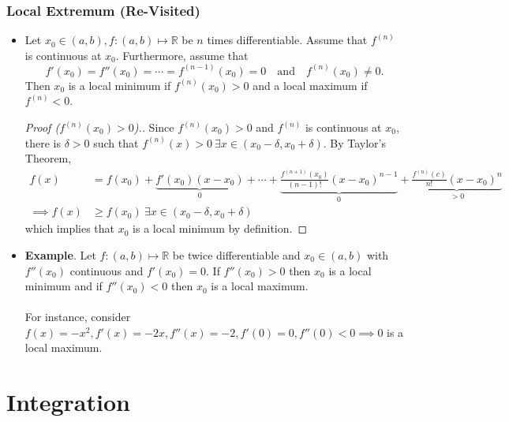 \documentclass{article}
\newcommand{\R}{\mathbb{R}}
\newcommand{\?}{\stackrel{?}{=}}
\theoremstyle{definition} %
\begin{document}
\subsubsection{Local Extremum (Re-Visited)}

\begin{itemize}
    \item[]
    \begin{lemma}
        Let $x_0 \in (a, b), f: (a, b) \mapsto \R$ be $n$ times differentiable. Assume that $f^{(n)}$ is continuous at $x_0$. Furthermore, assume that
        $$f'(x_0) = f''(x_0) = \cdots = f^{(n - 1)}(x_0) = 0 \quad \text{and} \quad f^{(n)}(x_0) \neq 0.$$
        Then $x_0$ is a local minimum if $f^{(n)}(x_0) > 0$ and a local maximum if $f^{(n)} < 0$.
    \end{lemma}
    \begin{proof}[Proof ($f^{(n)}(x_0) > 0$).]
        Since $f^{(n)}(x_0) > 0$ and $f^{(n)}$ is continuous at $x_0$, there is $\delta > 0$ such that $f^{(n)}(x) > 0 \ \exists x \in (x_0 - \delta, x_0 + \delta)$. By Taylor's Theorem,
        \begin{align*}
            f(x) &= f(x_0) + \underbrace{f'(x_0)(x - x_0)}_{0} + \cdots + \underbrace{\frac{f^{(n + 1)}(x_0)}{(n - 1)!}(x - x_0)^{n - 1}}_{0} + \underbrace{\frac{f^{(n)}(c)}{n!}(x - x_0)^n}_{> 0} \\
            \implies f(x) &\geq f(x_0) \ \exists x \in (x_0 - \delta, x_0 + \delta)
        \end{align*}
        which implies that $x_0$ is a local minimum by definition.
    \end{proof}
    \item \textbf{Example}. Let $f: (a, b) \mapsto \R$ be twice differentiable and $x_0 \in (a, b)$ with $f''(x_0)$ continuous and $f'(x_0) = 0$. If $f''(x_0) > 0$ then $x_0$ is a local minimum and if $f''(x_0) < 0$ then $x_0$ is a local maximum. \\\\
    For instance, consider $f(x) = -x^2, f'(x) = -2x, f''(x) = -2, f'(0) = 0, f''(0) < 0 \implies 0$ is a local maximum.
\end{itemize}

\section{Integration}
\end{document}
